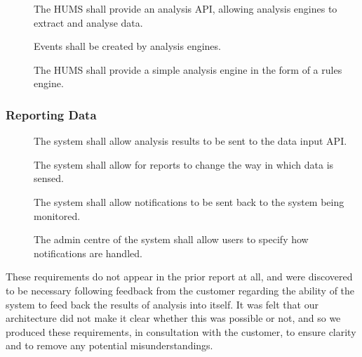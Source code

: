 \begin{description}[leftmargin=1.3cm, itemsep=0.3cm]
\begin{description}
 		\item[] The HUMS shall provide an analysis API, allowing 			analysis engines to extract and analyse data.
		
		\item[] Events shall be created by analysis engines.

 		\item[] The HUMS shall provide a simple analysis engine
 		in the form of a rules engine.
	\end{description}
\end{description}

\subsubsection{Reporting Data}
\label{sec:requirements-functional-feedback}

\begin{description}
 \item[] The system shall allow analysis results to be sent
 to the data input API.

 \item[] The system shall allow for reports to change the way
 in which data is sensed.

 \item[] The system shall allow notifications to be sent back
 to the system being monitored.

 \item[] The admin centre of the system shall allow users to
 specify how notifications are handled. 
\end{description}

These requirements do not appear in the prior report at all, and were
discovered to be necessary following feedback from the customer
regarding the ability of the system to feed back the results of
analysis into itself. It was felt that our architecture did not make
it clear whether this was possible or not, and so we produced these
requirements, in consultation with the customer, to ensure clarity and
to remove any potential misunderstandings.
